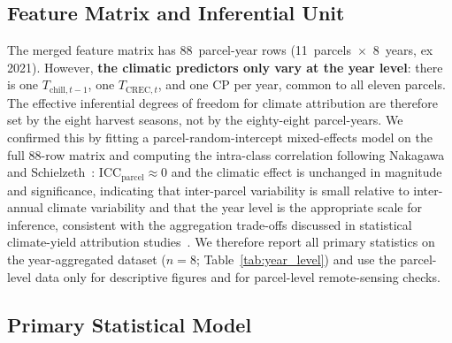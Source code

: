 \documentclass[agronomy,article,submit,pdftex,moreauthors]{Definitions/mdpi}
\begin{document}
\subsection{Feature Matrix and Inferential Unit}
\label{sec:inferential_unit}

The merged feature matrix has 88~parcel-year rows (11~parcels~$\times$~8~years, ex 2021). However, \textbf{the climatic predictors only vary at the year level}: there is one $T_{\text{chill},t-1}$, one $T_{\text{CREC},t}$, and one CP per year, common to all eleven parcels. The effective inferential degrees of freedom for climate attribution are therefore set by the eight harvest seasons, not by the eighty-eight parcel-years. We confirmed this by fitting a parcel-random-intercept mixed-effects model on the full 88-row matrix and computing the intra-class correlation following Nakagawa and Schielzeth~\cite{nakagawa2013}: $\text{ICC}_\text{parcel}\approx 0$ and the climatic effect is unchanged in magnitude and significance, indicating that inter-parcel variability is small relative to inter-annual climate variability and that the year level is the appropriate scale for inference, consistent with the aggregation trade-offs discussed in statistical climate-yield attribution studies~\cite{lobellburke2010}. We therefore report all primary statistics on the year-aggregated dataset ($n=8$; Table~\ref{tab:year_level}) and use the parcel-level data only for descriptive figures and for parcel-level remote-sensing checks.



\subsection{Primary Statistical Model}
\label{sec:primary_model}
\end{document}
